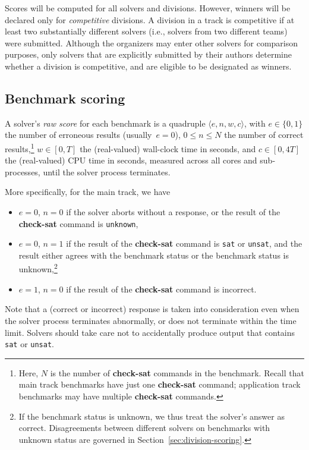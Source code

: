 \documentclass[12pt]{article}
\newcommand{\akey}[1]{\textbf{#1}}
\begin{document}
Scores will be computed for all solvers and divisions.  However,
winners will be declared only for \emph{competitive} divisions.  A
division in a track is competitive if at least two substantially
different solvers (i.e., solvers from two different teams) were
submitted.  Although the organizers may enter other solvers for
comparison purposes, only solvers that are explicitly submitted by
their authors determine whether a division is competitive, and are
eligible to be designated as winners.

\subsection{Benchmark scoring}
\label{sec:benchmark-scoring}

A solver's \emph{raw score} for each benchmark is a quadruple $\langle
e, n, w, c\rangle$, with $e \in \{0, 1\}$ the number of erroneous
results (usually~$e = 0$), $0 \leq n \leq N$ the number of correct
results,\footnote{Here, $N$ is the number of \akey{check-sat} commands
  in the benchmark.  Recall that main track benchmarks have just one
  \akey{check-sat} command; application track benchmarks may have
  multiple \akey{check-sat} commands.} $w \in [0,T]$ the (real-valued)
wall-clock time in seconds, and $c \in [0, 4T]$ the (real-valued) CPU
time in seconds, measured across all cores and sub-processes, until
the solver process terminates.

 More specifically, for the main track, we have
%
\begin{itemize}
\item $e=0$, $n=0$ if the solver aborts without a response, or the
  result of the \akey{check-sat} command is \texttt{unknown},
\item $e=0$, $n=1$ if the result of the \akey{check-sat} command is
  \texttt{sat} or \texttt{unsat}, and the result either agrees with
  the benchmark status or the benchmark status is unknown,\footnote{If
    the benchmark status is unknown, we thus treat the solver's answer
    as correct.  Disagreements between different solvers on benchmarks
    with unknown status are governed in
    Section~\ref{sec:division-scoring}.}
\item $e=1$, $n=0$ if the result of the \akey{check-sat} command is
  incorrect.
\end{itemize}
%
Note that a (correct or incorrect) response is taken into
consideration even when the solver process terminates abnormally, or
does not terminate within the time limit.  Solvers should take care
not to accidentally produce output that contains \texttt{sat} or
\texttt{unsat}.
\end{document}
